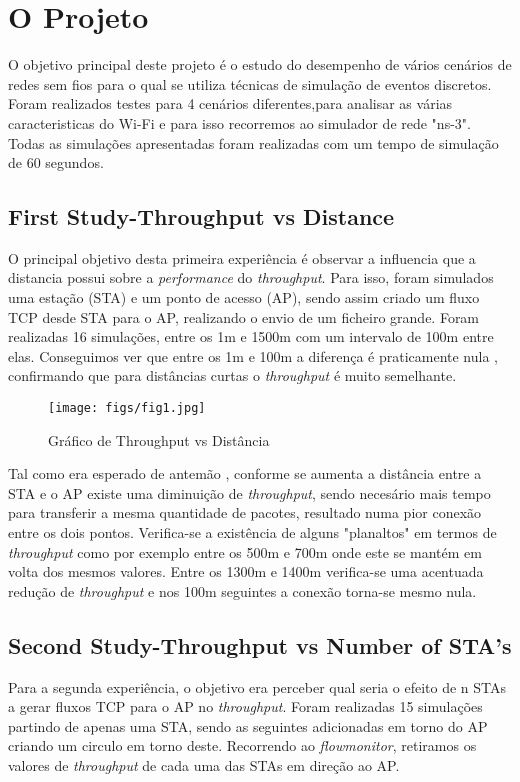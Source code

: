 \chapter{O Projeto} \label{int}

O objetivo principal deste projeto é o estudo do desempenho de vários cenários de redes sem fios
para o qual se utiliza técnicas de simulação de eventos discretos. Foram realizados testes para 4 cenários diferentes,para analisar as várias caracteristicas do Wi-Fi e
para isso recorremos ao simulador de rede "ns-3". Todas as simulações apresentadas foram realizadas com um tempo de simulação de 60 segundos.




\section{First Study-Throughput vs Distance} \label{ex1}

    O principal objetivo desta primeira experiência é observar a influencia que a distancia possui sobre a \textit{performance} do \textit{throughput}. Para isso, foram simulados
uma estação (STA) e um ponto de acesso (AP), sendo assim criado um fluxo TCP desde STA para o AP, realizando o envio de um ficheiro grande.
Foram realizadas 16 simulações, entre os 1m e 1500m com um intervalo de 100m entre elas. Conseguimos ver que entre os 1m e 100m a diferença é praticamente nula , 
confirmando que para distâncias curtas o \textit{throughput} é muito semelhante.

\begin{figure}[H]
    \centering
    \texttt{[image: figs/fig1.jpg]}
    \caption{Gráfico de Throughput vs Distância}
    \label{fig:1}
\end{figure}

Tal como era esperado de antemão , conforme se aumenta a distância entre a STA e o AP existe uma diminuição de \textit{throughput}, sendo necesário mais tempo para transferir a mesma quantidade
de pacotes, resultado numa pior conexão entre os dois pontos. Verifica-se a existência de alguns "planaltos" em termos de \textit{throughput} como por exemplo entre os 500m e 700m
onde este se mantém em volta dos mesmos valores. Entre os 1300m e 1400m verifica-se uma acentuada redução de \textit{throughput} e nos 100m seguintes a conexão torna-se mesmo nula.


\section{Second Study-Throughput vs Number of STA's} \label{ex2}
    Para a segunda experiência, o objetivo era perceber qual seria o efeito de n STAs a gerar
fluxos TCP para o AP no \textit{throughput}. Foram realizadas 15 simulações partindo de apenas uma STA,
sendo as seguintes adicionadas em torno do AP criando um circulo em torno deste. Recorrendo ao \textit{flowmonitor},
retiramos os valores de \textit{throughput} de cada uma das STAs em direção ao AP.


